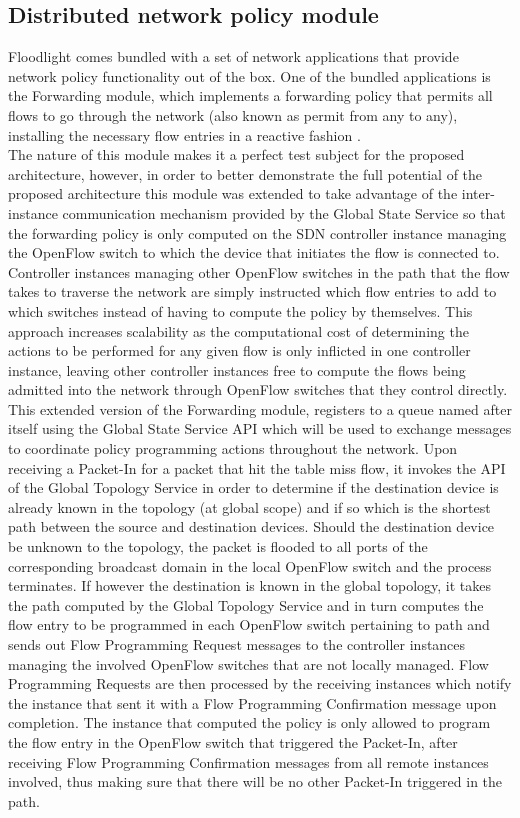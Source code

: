 \subsection{Distributed network policy module}
\label{subsection:poc-application}
%
Floodlight comes bundled with a set of network applications that provide network policy functionality out of the box.
One of the bundled applications is the Forwarding module, which implements a forwarding policy that permits all flows to go through the network (also known as permit from any to any), installing the necessary flow entries in a reactive fashion \cite{FLFwd}.\\
The nature of this module makes it a perfect test subject for the proposed architecture, however, in order to better demonstrate the full potential of the proposed architecture this module was extended to take advantage of the inter-instance communication mechanism provided by the Global State Service so that the forwarding policy is only computed on the \gls{SDN} controller instance managing the OpenFlow switch to which the device that initiates the flow is connected to. Controller instances managing other OpenFlow switches in the path that the flow takes to traverse the network are simply instructed which flow entries to add to which switches instead of having to compute the policy by themselves.
This approach increases scalability as the computational cost of determining the actions to be performed for any given flow is only inflicted in one controller instance, leaving other controller instances free to compute the flows being admitted into the network through OpenFlow switches that they control directly.\\
This extended version of the Forwarding module, registers to a queue named after itself using the Global State Service \gls{API} which will be used to exchange messages to coordinate policy programming actions throughout the network.
Upon receiving a Packet-In for a packet that hit the table miss flow, it invokes the \gls{API} of the Global Topology Service in order to determine if the destination device is already known in the topology (at global scope) and if so which is the shortest path between the source and destination devices.
Should the destination device be unknown to the topology, the packet is flooded to all ports of the corresponding broadcast domain in the local OpenFlow switch and the process terminates.
If however the destination is known in the global topology, it takes the path computed by the Global Topology Service and in turn computes the flow entry to be programmed in each OpenFlow switch pertaining to path and sends out Flow Programming Request messages to the controller instances managing the involved OpenFlow switches that are not locally managed.
Flow Programming Requests are then processed by the receiving instances which notify the instance that sent it with a Flow Programming Confirmation message upon completion.
The instance that computed the policy is only allowed to program the flow entry in the OpenFlow switch that triggered the Packet-In, after receiving Flow Programming Confirmation messages from all remote instances involved, thus making sure that there will be no other Packet-In triggered in the path.
%
